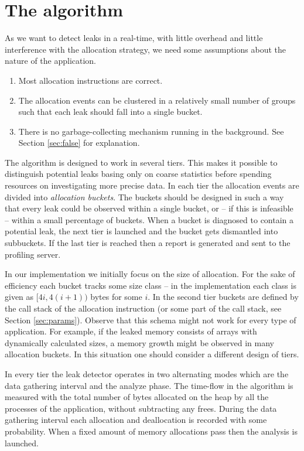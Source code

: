 \documentclass[preprint, numbers]{sigplanconf}
\begin{document}
\section{The algorithm}

As we want to detect leaks in a real-time, with little overhead and little interference with
the allocation strategy, we need some assumptions about the nature of the application.

\begin{enumerate}
\item Most allocation instructions are correct.
\item The allocation events can be clustered in a relatively small number of groups
	such that each leak should fall into a single bucket.
\item There is no garbage-collecting mechanism running in the background.
	See Section \ref{sec:false} for explanation.
\end{enumerate}

The algorithm is designed to work in several tiers.
This makes it possible to distinguish potential leaks basing only on coarse statistics before spending resources on investigating more
precise data.
In each tier the allocation events are divided into \textit{allocation buckets}.
The buckets should be designed in such a way that every leak could be observed within a single bucket,
or -- if this is infeasible -- within a small percentage of buckets.
When a bucket is diagnosed to contain a potential leak, the next tier is launched and the bucket gets dismantled
into subbuckets.
If the last tier is reached then a report is generated and sent to the profiling server.

In our implementation we initially focus on the size of allocation.
For the sake of efficiency each bucket tracks some size class --
in the implementation each class is given as $[4i, 4(i+1))$ bytes for some $i$.
In the second tier buckets are defined by the call stack of the allocation instruction
(or some part of the call stack, see Section \ref{sec:params}).
Observe that this schema might not work for every type of application.
For example, if the leaked memory consists of arrays with dynamically calculated sizes,
a memory growth might be observed in many allocation buckets.
In this situation one should consider a different design of tiers.

In every tier the leak detector operates in two alternating modes which are
the data gathering interval and the analyze phase.
The time-flow in the algorithm is measured with the total number of bytes allocated on the heap
by all the processes of the application, without subtracting any frees.
During the data gathering interval each allocation and deallocation is recorded with some
probability.
When a fixed amount of memory allocations pass then the analysis is launched.
\end{document}
